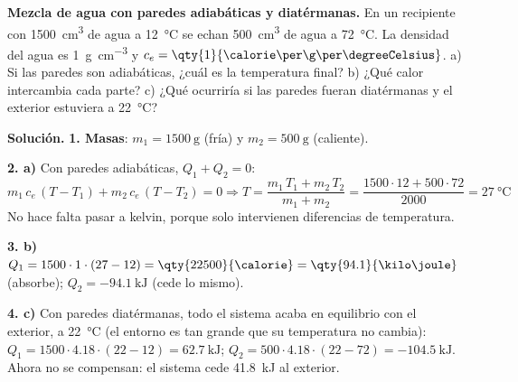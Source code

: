 \begin{example}
    \textbf{Mezcla de agua con paredes adiabáticas y diatérmanas.} En un recipiente con \qty{1500}{\cm\cubed} de agua a
    \qty{12}{\degreeCelsius} se echan \qty{500}{\cm\cubed} de agua a \qty{72}{\degreeCelsius}. La densidad del agua es
    \qty{1}{\g\per\cm\cubed} y \(c_e = \qty{1}{\calorie\per\g\per\degreeCelsius}\). a) Si las paredes son adiabáticas, ¿cuál es la
    temperatura final? b) ¿Qué calor intercambia cada parte? c) ¿Qué ocurriría si las paredes fueran diatérmanas y el exterior
    estuviera a \qty{22}{\degreeCelsius}?

    \textbf{Solución.} \textbf{1. Masas}: \(m_1 = \qty{1500}{\g}\) (fría) y \(m_2 = \qty{500}{\g}\) (caliente).

    \textbf{2. a)} Con paredes adiabáticas, \(Q_1 + Q_2 = 0\):
    \[ m_1\,c_e\,(T - T_1) + m_2\,c_e\,(T - T_2) = 0 \Rightarrow T = \frac{m_1\,T_1 + m_2\,T_2}{m_1 + m_2} = \frac{1500 \cdot 12 +
    500 \cdot 72}{2000} = \qty{27}{\degreeCelsius} \]
    No hace falta pasar a kelvin, porque solo intervienen diferencias de temperatura.

    \textbf{3. b)} \(Q_1 = 1500 \cdot 1 \cdot (27 - 12) = \qty{22500}{\calorie} = \qty{94.1}{\kilo\joule}\) (absorbe);
    \(Q_2 = \qty{-94.1}{\kilo\joule}\) (cede lo mismo).

    \textbf{4. c)} Con paredes diatérmanas, todo el sistema acaba en equilibrio con el exterior, a \qty{22}{\degreeCelsius} (el entorno
    es tan grande que su temperatura no cambia):
    \(Q_1 = 1500 \cdot \num{4.18} \cdot (22 - 12) = \qty{+62.7}{\kilo\joule}\);
    \(Q_2 = 500 \cdot \num{4.18} \cdot (22 - 72) = \qty{-104.5}{\kilo\joule}\). Ahora no se compensan: el sistema cede
    \qty{41.8}{\kilo\joule} al exterior.
\end{example}

